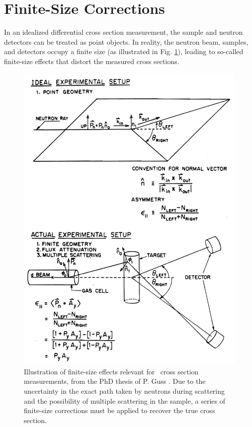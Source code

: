 \section{Finite-Size Corrections}
In an idealized differential cross section measurement, the sample and neutron
detectors can be treated as point objects. In reality, the neutron beam,
samples, and detectors occupy a finite size (as illustrated in Fig. \ref{GussFiniteSizeDiagram}),
leading to so-called finite-size effects that distort the measured cross sections.
\begin{figure}[tb]
    \centering
        \includegraphics[height=0.7\textheight]{figures/GussFiniteSizeDiagram.png}
        \caption[Illustration of finite-size effects relevant for \el\ cross
        section measurements]
        {
            Illustration of finite-size effects relevant for \el\ cross
            section measurements, from the PhD thesis of P. Guss
            \cite{GussPhDThesis}. Due to the uncertainty in the exact path taken
            by neutrons during scattering and the possibility of multiple
            scattering in the sample, a series of finite-size corrections
            must be applied to recover the true cross section.
        }
        \label{GussFiniteSizeDiagram}
\end{figure}
